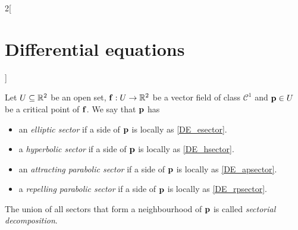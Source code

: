 \documentclass[../../../main.tex]{subfiles}
\begin{document}
\begin{multicols}{2}[\section{Differential equations}]
\begin{definition}
  \end{definition}
  \begin{center}
    \begin{minipage}{\linewidth}
      \centering
      
    \end{minipage}
  \end{center}
  \begin{definition}
    Let $U\subseteq \mathbb{R}^2$ be an open set, $\boldsymbol{\mathrm{f}}:U\rightarrow\mathbb{R}^2$ be a vector field of class $\mathcal{C}^1$ and $\boldsymbol{\mathrm{p}}\in U$ be a critical point of $\boldsymbol{\mathrm{f}}$. We say that $\boldsymbol{\mathrm{p}}$ has
    \begin{itemize}
      \item an \emph{elliptic sector} if a side of $\boldsymbol{\mathrm{p}}$ is locally as \cref{DE_esector}.
      \item a \emph{hyperbolic sector} if a side of $\boldsymbol{\mathrm{p}}$ is locally as \cref{DE_hsector}.
      \item  an \emph{attracting parabolic sector} if a side of $\boldsymbol{\mathrm{p}}$ is locally as \cref{DE_apsector}.
      \item a \emph{repelling parabolic sector} if a side of $\boldsymbol{\mathrm{p}}$ is locally as \cref{DE_rpsector}.
    \end{itemize}
    The union of all sectors that form a neighbourhood of $\boldsymbol{\mathrm{p}}$ is called \emph{sectorial decomposition}.
    \begin{center}
      \begin{minipage}[b]{0.475\linewidth}
        \centering
        
        \label{DE_esector}
      \end{minipage}\hfill
      \begin{minipage}[b]{0.475\linewidth}
        \centering
        
        \label{DE_hsector}
      \end{minipage}
    \end{center}
    \begin{center}
      \begin{minipage}[b]{0.475\linewidth}
        \centering
        

\end{minipage}
\end{center}
\end{definition}
\end{multicols}
\end{document}
